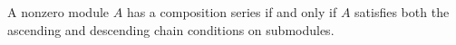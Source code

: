 A nonzero module $A$ has a composition series if and only if $A$ satisfies both the ascending and descending chain conditions on submodules.
